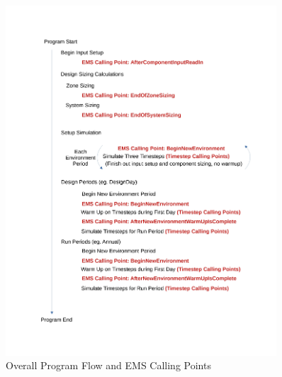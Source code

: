 \begin{figure}[hbtp] %
\centering
\includegraphics[width=0.9\textwidth, height=0.9\textheight, keepaspectratio=true]{media/image003.jpg}
\caption{Overall Program Flow and EMS Calling Points \protect \label{fig:overall-program-flow-and-ems-calling-points}}
\end{figure}

